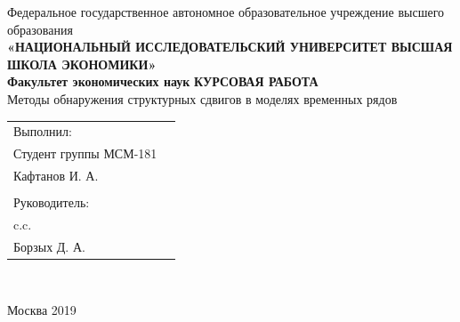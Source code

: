 \documentclass[a4paper,14pt,russian]{extarticle}
\begin{document}
	\renewcommand\contentsname{Содержание}
	\thispagestyle{empty}
	
	\begin{center}
		{\footnotesize Федеральное государственное автономное образовательное учреждение высшего образования}\\
		{\small \textbf{«НАЦИОНАЛЬНЫЙ ИССЛЕДОВАТЕЛЬСКИЙ УНИВЕРСИТЕТ ВЫСШАЯ ШКОЛА ЭКОНОМИКИ»}}\\
		\textbf{Факультет экономических наук}	 
		\vspace{0.75cm}
		\vfill
		{\large\textbf{КУРСОВАЯ РАБОТА}}\\
		\vspace{0.75cm}
		Методы обнаружения структурных сдвигов в моделях временных рядов
	\end{center}
	\vfill	
	\begin{small}
	\begin{flushright}
		\begin{tabular}{p{5cm} l}
			Выполнил: & \\
			Студент группы МСМ-181 & \\
			Кафтанов И. А. & \\
			& \\
			Руководитель: & \\
			c.c. & \\
			Борзых Д. А. & \\
		\end{tabular}\\
	\end{flushright}	
	\end{small}
	\vfill
	\begin{center}
		{\small Москва 2019}
	\end{center}

	\newpage
	\tableofcontents
	\thispagestyle{empty}
	\newpage
\end{document}
